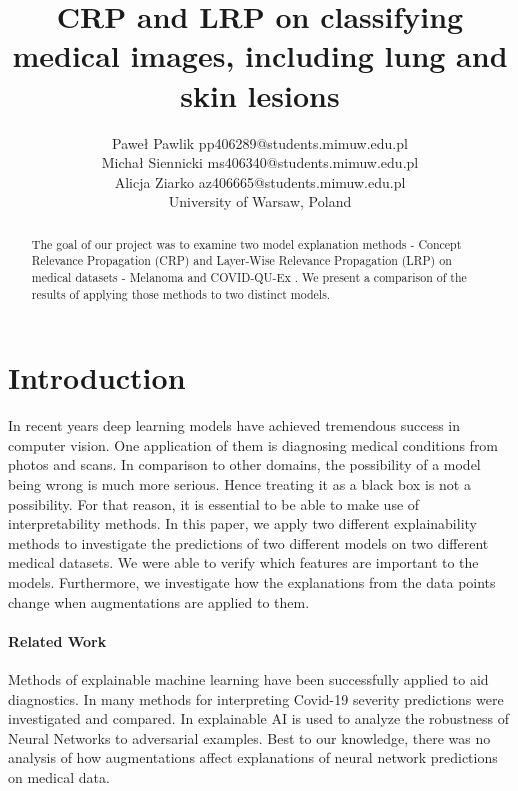 \documentclass[twoside,11pt]{article}
\begin{document}
\title{
CRP and LRP on classifying medical images, including lung and skin lesions
}

\author{\name Paweł Pawlik \email pp406289@students.mimuw.edu.pl \\
    \name Michał Siennicki \email ms406340@students.mimuw.edu.pl \\
    \name Alicja Ziarko \email az406665@students.mimuw.edu.pl \\
    \addr University of Warsaw, Poland\\
}

\maketitle

\begin{abstract}%
The goal of our project was to examine two model explanation methods - Concept
Relevance Propagation (CRP) \citep{https://doi.org/10.48550/arxiv.2206.03208} and 
Layer-Wise Relevance Propagation (LRP) \citep{Montavon2019} on medical datasets - Melanoma \citep{melanoma} and COVID-QU-Ex \citep{covid}. We present a comparison of the results of applying those methods to two distinct models.

\end{abstract}

\section{Introduction}
In recent years deep learning models have achieved tremendous success in computer vision. One application of them is diagnosing medical conditions from photos and scans. In comparison to other domains, the possibility of a model being wrong is much more serious. Hence treating it as a black box is not a possibility. For that reason, it is essential to be able to make use of interpretability methods. In this paper, we apply two different explainability methods to investigate the predictions of two different models on two different medical datasets. We were able to verify which features are important to the models. Furthermore, we investigate how the explanations from the data points change when augmentations are applied to them.
\paragraph{Related Work}
Methods of explainable machine learning have been successfully applied to aid diagnostics. In \citep{Covid_stuff} many methods for interpreting Covid-19 severity predictions were investigated and compared.
In \citep{mahima2021assessment} explainable AI is used to analyze the robustness of Neural Networks to adversarial examples.
Best to our knowledge, there was no analysis of how augmentations affect explanations of neural network predictions on medical data.
\end{document}
